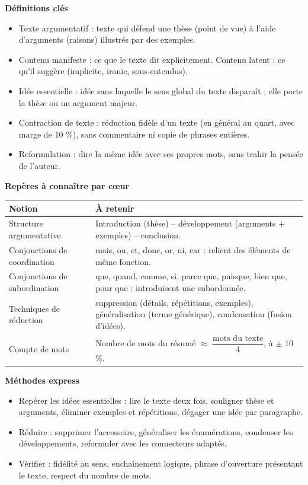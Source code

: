\documentclass[11pt]{article}
\newcommand{\cle}[1]{{\popxbold\color{popdark}#1}}
\begin{document}
\begin{bilan}
\textbf{Définitions clés}
\begin{itemize}
\item \cle{Texte argumentatif} : texte qui défend une \cle{thèse} (point de vue) à l'aide d'\cle{arguments} (raisons) illustrés par des \cle{exemples}.
\item \cle{Contenu manifeste} : ce que le texte dit explicitement. \cle{Contenu latent} : ce qu'il suggère (implicite, ironie, sous-entendus).
\item \cle{Idée essentielle} : idée sans laquelle le sens global du texte disparaît ; elle porte la thèse ou un argument majeur.
\item \cle{Contraction de texte} : réduction fidèle d'un texte (en général au quart, avec marge de 10 \%), sans commentaire ni copie de phrases entières.
\item \cle{Reformulation} : dire la même idée avec ses propres mots, sans trahir la pensée de l'auteur.
\end{itemize}

\textbf{Repères à connaître par cœur}
\begin{center}
\begin{tabularx}{\linewidth}{|l|X|}\hline
\rowcolor{popblueL} \textbf{Notion} & \textbf{À retenir} \\ \hline
Structure argumentative & Introduction (thèse) -- développement (arguments + exemples) -- conclusion. \\ \hline
Conjonctions de coordination & mais, ou, et, donc, or, ni, car : relient des éléments de même fonction. \\ \hline
Conjonctions de subordination & que, quand, comme, si, parce que, puisque, bien que, pour que : introduisent une subordonnée. \\ \hline
Techniques de réduction & suppression (détails, répétitions, exemples), généralisation (terme générique), condensation (fusion d'idées). \\ \hline
Compte de mots & Nombre de mots du résumé $\approx$ $\dfrac{\text{mots du texte}}{4}$, à $\pm$ 10 \%. \\ \hline
\end{tabularx}
\end{center}

\textbf{Méthodes express}
\begin{itemize}
\item Repérer les idées essentielles : lire le texte deux fois, souligner thèse et arguments, éliminer exemples et répétitions, dégager une idée par paragraphe.
\item Réduire : supprimer l'accessoire, généraliser les énumérations, condenser les développements, reformuler avec les connecteurs adaptés.
\item Vérifier : fidélité au sens, enchaînement logique, phrase d'ouverture présentant le texte, respect du nombre de mots.
\end{itemize}
\end{bilan}
\end{document}
